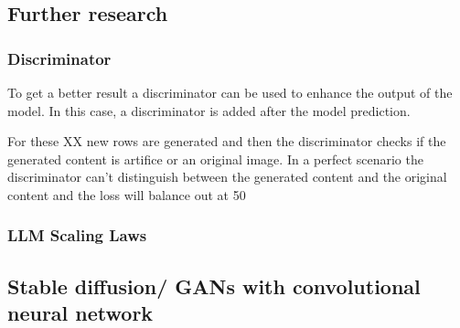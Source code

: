 \subsection{Further research}

    \subsubsection{Discriminator}
    To get a better result a discriminator can be used to enhance the output of the model. In this case, a discriminator is added after the model prediction.

    For these XX new rows are generated and then the discriminator checks if the generated content is artifice or an original image. In a perfect scenario the discriminator can't distinguish between the generated content and the original content and the loss will balance out at 50

    \subsubsection{LLM Scaling Laws}


    \subsection{Stable diffusion/ GANs with convolutional neural network}